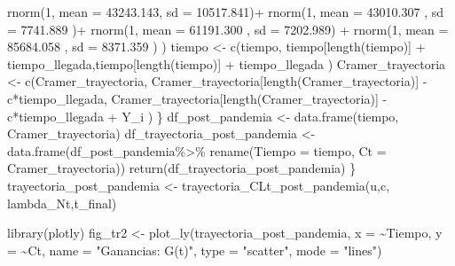 \documentclass[
  us-letterpaper,
]{scrreprt}
\newenvironment{Shaded}{\begin{snugshade}}{\end{snugshade}}
\newcommand{\AttributeTok}[1]{\textcolor[rgb]{0.40,0.45,0.13}{#1}}
\newcommand{\DecValTok}[1]{\textcolor[rgb]{0.68,0.00,0.00}{#1}}
\newcommand{\FloatTok}[1]{\textcolor[rgb]{0.68,0.00,0.00}{#1}}
\newcommand{\FunctionTok}[1]{\textcolor[rgb]{0.28,0.35,0.67}{#1}}
\newcommand{\NormalTok}[1]{\textcolor[rgb]{0.00,0.23,0.31}{#1}}
\newcommand{\OtherTok}[1]{\textcolor[rgb]{0.00,0.23,0.31}{#1}}
\newcommand{\SpecialCharTok}[1]{\textcolor[rgb]{0.37,0.37,0.37}{#1}}
\newcommand{\StringTok}[1]{\textcolor[rgb]{0.13,0.47,0.30}{#1}}
\theoremstyle{definition}
\theoremstyle{plain}
\theoremstyle{plain}
\theoremstyle{remark}
\begin{document}
\begin{Shaded}
\begin{Highlighting}[]
             \FunctionTok{rnorm}\NormalTok{(}\DecValTok{1}\NormalTok{, }\AttributeTok{mean =}   \FloatTok{43243.143}\NormalTok{, }\AttributeTok{sd =} \FloatTok{10517.841}\NormalTok{)}\SpecialCharTok{+} 
             \FunctionTok{rnorm}\NormalTok{(}\DecValTok{1}\NormalTok{, }\AttributeTok{mean =} \FloatTok{43010.307}\NormalTok{  , }\AttributeTok{sd =} \FloatTok{7741.889}\NormalTok{ )}\SpecialCharTok{+} 
             \FunctionTok{rnorm}\NormalTok{(}\DecValTok{1}\NormalTok{, }\AttributeTok{mean =} \FloatTok{61191.300}\NormalTok{  , }\AttributeTok{sd =} \FloatTok{7202.989}\NormalTok{) }\SpecialCharTok{+} 
             \FunctionTok{rnorm}\NormalTok{(}\DecValTok{1}\NormalTok{, }\AttributeTok{mean =}  \FloatTok{85684.058}\NormalTok{ , }\AttributeTok{sd =} \FloatTok{8371.359}\NormalTok{ ) ) }
\NormalTok{tiempo }\OtherTok{\textless{}{-}} \FunctionTok{c}\NormalTok{(tiempo, tiempo[}\FunctionTok{length}\NormalTok{(tiempo)] }\SpecialCharTok{+}
\NormalTok{              tiempo\_llegada,tiempo[}\FunctionTok{length}\NormalTok{(tiempo)] }\SpecialCharTok{+}
\NormalTok{              tiempo\_llegada ) }
\NormalTok{Cramer\_trayectoria }\OtherTok{\textless{}{-}} \FunctionTok{c}\NormalTok{(Cramer\_trayectoria,}
\NormalTok{Cramer\_trayectoria[}\FunctionTok{length}\NormalTok{(Cramer\_trayectoria)] }\SpecialCharTok{{-}}
\NormalTok{  c}\SpecialCharTok{*}\NormalTok{tiempo\_llegada, }
\NormalTok{Cramer\_trayectoria[}\FunctionTok{length}\NormalTok{(Cramer\_trayectoria)] }\SpecialCharTok{{-}}
\NormalTok{  c}\SpecialCharTok{*}\NormalTok{tiempo\_llegada }\SpecialCharTok{+}\NormalTok{  Y\_i )}
\NormalTok{  \}}
\NormalTok{  df\_post\_pandemia }\OtherTok{\textless{}{-}} \FunctionTok{data.frame}\NormalTok{(tiempo, Cramer\_trayectoria)}
\NormalTok{df\_trayectoria\_post\_pandemia }\OtherTok{\textless{}{-}} \FunctionTok{data.frame}\NormalTok{(df\_post\_pandemia}\SpecialCharTok{\%\textgreater{}\%} 
                                        \FunctionTok{rename}\NormalTok{(}\AttributeTok{Tiempo =}\NormalTok{ tiempo,}
                                        \AttributeTok{Ct =}\NormalTok{ Cramer\_trayectoria))}
  \FunctionTok{return}\NormalTok{(df\_trayectoria\_post\_pandemia)}
\NormalTok{\}}
\NormalTok{trayectoria\_post\_pandemia }\OtherTok{\textless{}{-}} \FunctionTok{trayectoria\_CLt\_post\_pandemia}\NormalTok{(u,c,}
\NormalTok{                                              lambda\_Nt,t\_final)}


\FunctionTok{library}\NormalTok{(plotly)}
\NormalTok{fig\_tr2 }\OtherTok{\textless{}{-}} \FunctionTok{plot\_ly}\NormalTok{(trayectoria\_post\_pandemia, }\AttributeTok{x =} \SpecialCharTok{\textasciitilde{}}\NormalTok{Tiempo, }
                                              \AttributeTok{y =} \SpecialCharTok{\textasciitilde{}}\NormalTok{Ct, }
          \AttributeTok{name =} \StringTok{"Ganancias: G(t)"}\NormalTok{,}
          \AttributeTok{type =} \StringTok{"scatter"}\NormalTok{, }\AttributeTok{mode =} \StringTok{"lines"}\NormalTok{)}


\end{Highlighting}
\end{Shaded}
\end{document}
